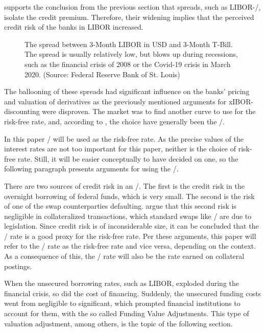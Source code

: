 \documentclass[main.tex]{subfiles}
\begin{document}
     supports the conclusion from the previous section
    that spreads, such as LIBOR-\OIS/, isolate the credit premium.
    Therefore, their widening implies that the perceived credit risk of the banks in LIBOR increased.

    \begin{figure}
        \centering
        \resizebox{\textwidth}{!}{%
            
        }
        \caption{
            The spread between 3-Month LIBOR in USD and 3-Month T-Bill.
            The spread is usually relatively low, 
            but blows up during recessions, 
            such as the financial crisis of 2008 or
            the Covid-19 crisis in March 2020.
            (Source: Federal Reserve Bank of St. Louis)
        }
        \label{fig:ted-spread}
    \end{figure}

    The ballooning of these spreads
    had significant influence on the banks' pricing and valuation of derivatives
    as the previously mentioned arguments for xIBOR-discounting were disproven.
    The market was to find another curve to use for the risk-free rate,
    and, according to \textcite{Green2015XVA}, the choice have generally been the \OIS/.

    In this paper \OIS/ will be used as the risk-free rate.
    As the precise values of the interest rates are not too important for this paper,
    neither is the choice of risk-free rate.
    Still, it will be easier conceptually to have decided on one,
    so the following paragraph presents arguments for using the \OIS/.

    There are two sources of credit risk in an \OIS/.
    The first is the credit risk in the overnight borrowing of federal funds, which is very small. 
    The second is the risk of one of the swap counterparties defaulting.
    \textcite{HullWhiteOISvsLIBOR}
    argue that this second risk is negligible in collateralized transactions,
    which standard swaps like \OIS/ are due to legislation.
    Since credit risk is of inconsiderable size, it can be concluded 
    that the \OIS/ rate is a good proxy for the risk-free rate.
    Per these arguments, this paper will refer to the \OIS/ rate as the risk-free rate
    and vice versa, depending on the context.
    As a consequence of this, the \OIS/ rate will also be the rate earned on collateral postings.

    When the unsecured borrowing rates, such as LIBOR, exploded during the financial crisis, 
    so did the cost of financing. 
    Suddenly, the unsecured funding costs went from negligible to significant,
    which prompted financial institutions to account for them, 
    with the so called Funding Value Adjustments. 
    This type of valuation adjustment, among others, is the topic of the following section.
\end{document}
